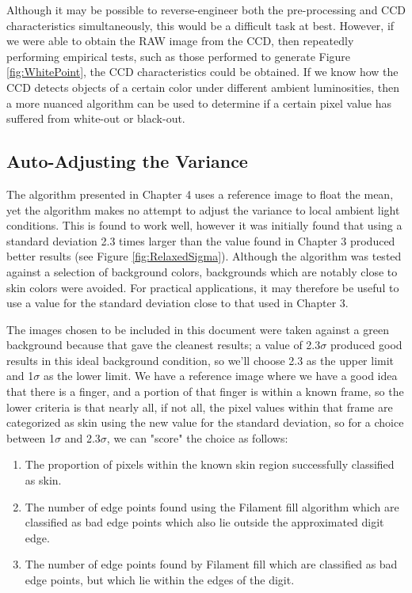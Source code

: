 Although it may be possible to reverse-engineer both the pre-processing and CCD characteristics simultaneously, this would be a difficult task at best. However, if we were able to obtain the RAW image from the CCD, then repeatedly performing empirical tests, such as those performed to generate Figure \ref{fig:WhitePoint}, the CCD characteristics could be obtained. If we know how the CCD detects objects of a certain color under different ambient luminosities, then a more nuanced algorithm can be used to determine if a certain pixel value has suffered from white-out or black-out.

\subsection{Auto-Adjusting the Variance}\label{sec:AutoAdjustingTheVariance}
The algorithm presented in Chapter 4 uses a reference image to float the mean, yet the algorithm makes no attempt to adjust the variance to local ambient light conditions. This is found to work well, however it was initially found that using a standard deviation 2.3 times larger than the value found in Chapter 3 produced better results (see Figure \ref{fig:RelaxedSigma}). Although the algorithm was tested against a selection of background colors, backgrounds which are notably close to skin colors were avoided. For practical applications, it may therefore be useful to use a value for the standard deviation close to that used in Chapter 3.

The images chosen to be included in this document were taken against a green background because that gave the cleanest results; a value of 2.3$\sigma$ produced good results in this ideal background condition, so we'll choose 2.3 as the upper limit and 1$\sigma$ as the lower limit. We have a reference image where we have a good idea that there is a finger, and a portion of that finger is within a known frame, so the lower criteria is that nearly all, if not all, the pixel values within that frame are categorized as skin using the new value for the standard deviation, so for a choice between 1$\sigma$ and 2.3$\sigma$, we can "score" the choice as follows:

\begin{enumerate}
\item The proportion of pixels within the known skin region successfully classified as skin.
\item The number of edge points found using the Filament fill algorithm which are classified as bad edge points which also lie outside the approximated digit edge.
\item The number of edge points found by Filament fill which are classified as bad edge points, but which lie within the edges of the digit.
\end{enumerate}

